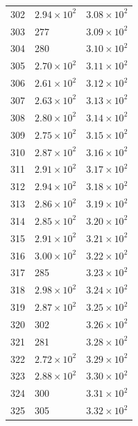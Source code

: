 \begin{table}[H]
\begin{tabular}{lll}
302 & $\displaystyle 2.94 \times 10^{2}$ & $\displaystyle 3.08 \times 10^{2}$ \\
303 & 277 & $\displaystyle 3.09 \times 10^{2}$ \\
304 & 280 & $\displaystyle 3.10 \times 10^{2}$ \\
305 & $\displaystyle 2.70 \times 10^{2}$ & $\displaystyle 3.11 \times 10^{2}$ \\
306 & $\displaystyle 2.61 \times 10^{2}$ & $\displaystyle 3.12 \times 10^{2}$ \\
307 & $\displaystyle 2.63 \times 10^{2}$ & $\displaystyle 3.13 \times 10^{2}$ \\
308 & $\displaystyle 2.80 \times 10^{2}$ & $\displaystyle 3.14 \times 10^{2}$ \\
309 & $\displaystyle 2.75 \times 10^{2}$ & $\displaystyle 3.15 \times 10^{2}$ \\
310 & $\displaystyle 2.87 \times 10^{2}$ & $\displaystyle 3.16 \times 10^{2}$ \\
311 & $\displaystyle 2.91 \times 10^{2}$ & $\displaystyle 3.17 \times 10^{2}$ \\
312 & $\displaystyle 2.94 \times 10^{2}$ & $\displaystyle 3.18 \times 10^{2}$ \\
313 & $\displaystyle 2.86 \times 10^{2}$ & $\displaystyle 3.19 \times 10^{2}$ \\
314 & $\displaystyle 2.85 \times 10^{2}$ & $\displaystyle 3.20 \times 10^{2}$ \\
315 & $\displaystyle 2.91 \times 10^{2}$ & $\displaystyle 3.21 \times 10^{2}$ \\
316 & $\displaystyle 3.00 \times 10^{2}$ & $\displaystyle 3.22 \times 10^{2}$ \\
317 & 285 & $\displaystyle 3.23 \times 10^{2}$ \\
318 & $\displaystyle 2.98 \times 10^{2}$ & $\displaystyle 3.24 \times 10^{2}$ \\
319 & $\displaystyle 2.87 \times 10^{2}$ & $\displaystyle 3.25 \times 10^{2}$ \\
320 & 302 & $\displaystyle 3.26 \times 10^{2}$ \\
321 & 281 & $\displaystyle 3.28 \times 10^{2}$ \\
322 & $\displaystyle 2.72 \times 10^{2}$ & $\displaystyle 3.29 \times 10^{2}$ \\
323 & $\displaystyle 2.88 \times 10^{2}$ & $\displaystyle 3.30 \times 10^{2}$ \\
324 & 300 & $\displaystyle 3.31 \times 10^{2}$ \\
325 & 305 & $\displaystyle 3.32 \times 10^{2}$ \\

\end{tabular}
\end{table}
